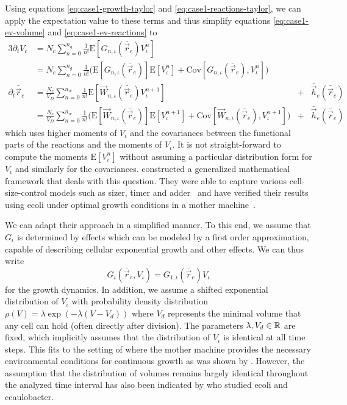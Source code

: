 Using equations \eqref{eq:case1-growth-taylor} and \eqref{eq:case1-reactions-taylor}, we can apply
the expectation value to these terms and thus simplify equations \eqref{eq:case1-ev-volume}
and \eqref{eq:case1-ev-reactions} to
\begin{alignat}{3}
    \partial_t V_c
    &= N_c\sum\limits_{n=0}^{n_g}\frac{1}{n!}
        \text{E}[G_{n,\iota}(\bar{\vec{r}}_e)V_\iota^n]\\
    &= N_c\sum\limits_{n=0}^{n_g}\frac{1}{n!}\Big(
        \text{E}[G_{n,\iota}(\bar{\vec{r}}_e)]\text{E}[V_\iota^n]
        + \text{Cov}[G_{n,\iota}(\bar{\vec{r}}_e),V_\iota^n]\Big)\\
    \partial_t\bar{\vec{r}}_e
    &= \frac{N_c}{V_D}\sum\limits_{n=0}^{n_w}\frac{1}{n!}
        \text{E}[\vec{W}_{n,\iota}(\bar{\vec{r}}_e)V_\iota^{n+1}]
        &+& \bar{\vec{h}}_e(\bar{\vec{r}}_e)\\
    &= \frac{N_c}{V_D}\sum\limits_{n=0}^{n_w}\frac{1}{n!}\Big(
        \text{E}[\vec{W}_{n,\iota}(\bar{\vec{r}}_e)]\text{E}[V_\iota^{n+1}]
        + \text{Cov}[\vec{W}_{n,\iota}(\bar{\vec{r}}_e),V_\iota^{n+1}]\Big)
        &+& \bar{\vec{h}}_e(\bar{\vec{r}}_e)
\end{alignat}
which uses higher moments of $V_\iota$ and the covariances between the functional parts of the
reactions and the moments of $V_\iota$.
It is not straight-forward to compute the moments $\text{E}[V_\iota^n]$ without assuming a
particular distribution form for $V_\iota$ and similarly for the covariances.
\citet{Cal2025} constructed a generalized mathematical framework that deals with this question.
They were able to capture various cell-size-control models such as sizer, timer and
adder~\cite{Amir2014Adder} and have verified their results using \ac{ecoli} under optimal growth
conditions in a mother machine~\cite{Tanouchi2017}.

We can adapt their approach in a simplified manner.
To this end, we assume that $G_\iota$ is determined by effects which can be modeled by a first order
approximation, capable of describing cellular exponential growth and other effects.
We can thus write
\begin{equation}
    G_\iota(\bar{\vec{r}}_e,V_\iota) = G_{1,\iota}(\bar{\vec{r}}_e)V_\iota
\end{equation}
for the growth dynamics.
In addition, we assume a shifted exponential distribution of $V_\iota$ with probability density
distribution $\rho(V)=\lambda\exp(-\lambda(V-V_d))$ where $V_d$ represents the minimal volume that
any cell can hold (often directly after division).
The parameters $\lambda,V_d\in\mathbb{R}$ are fixed, which implicitly assumes that the distribution of
$V_\iota$ is identical at all time steps.
This fits to the setting of \citet{Cal2025} where the mother machine provides the necessary
environmental conditions for continuous growth as was shown by \citet{IyerBiswas2014}.
However, the assumption that the distribution of volumes remains largely identical throughout the
analyzed time interval has also been indicated by \citet{Campos2014} who studied \ac{ecoli} and
\ac{ccaulobacter}.

